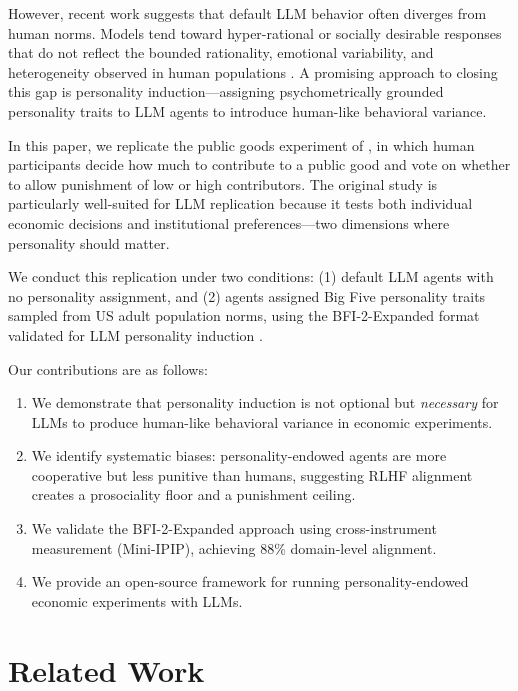 \documentclass[12pt, a4paper]{article}
\begin{document}
However, recent work suggests that default LLM behavior often diverges from human norms. Models tend toward hyper-rational or socially desirable responses that do not reflect the bounded rationality, emotional variability, and heterogeneity observed in human populations \citep{mei2024turing, kozlowski2025simulating}. A promising approach to closing this gap is personality induction---assigning psychometrically grounded personality traits to LLM agents to introduce human-like behavioral variance.

In this paper, we replicate the public goods experiment of \citet{ertan2009who}, in which human participants decide how much to contribute to a public good and vote on whether to allow punishment of low or high contributors. The original study is particularly well-suited for LLM replication because it tests both individual economic decisions and institutional preferences---two dimensions where personality should matter.

We conduct this replication under two conditions: (1) default LLM agents with no personality assignment, and (2) agents assigned Big Five personality traits sampled from US adult population norms, using the BFI-2-Expanded format validated for LLM personality induction \citep{huang2024designing, soto2017bfi2}.

Our contributions are as follows:
\begin{enumerate}
  \item We demonstrate that personality induction is not optional but \emph{necessary} for LLMs to produce human-like behavioral variance in economic experiments.
  \item We identify systematic biases: personality-endowed agents are more cooperative but less punitive than humans, suggesting RLHF alignment creates a prosociality floor and a punishment ceiling.
  \item We validate the BFI-2-Expanded approach using cross-instrument measurement (Mini-IPIP), achieving 88\% domain-level alignment.
  \item We provide an open-source framework for running personality-endowed economic experiments with LLMs.
\end{enumerate}

\section{Related Work}
\end{document}
